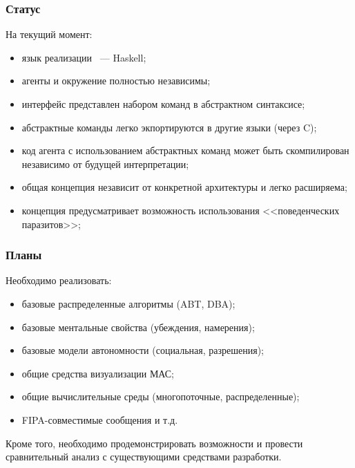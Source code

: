 \documentclass{beamer}
\begin{document}
\begin{frame}
  \frametitle{Статус}
  На текущий момент:
  \begin{itemize}
    \item язык реализации ~--- Haskell;
    \item агенты и окружение полностью независимы;
    \item интерфейс представлен набором команд в абстрактном синтаксисе;
    \item абстрактные команды легко экпортируются в другие языки (через C);
    \item код агента с использованием абстрактных команд может быть скомпилирован
      независимо от будущей интерпретации;
    \item общая концепция независит от конкретной архитектуры и легко расширяема;
    \item концепция предусматривает возможность использования <<поведенческих паразитов>>;
  \end{itemize}
\end{frame}

\begin{frame}
  \frametitle{Планы}
  Необходимо реализовать:
  \begin{itemize}
    \item базовые распределенные алгоритмы (ABT, DBA);
    \item базовые ментальные свойства (убеждения, намерения);
    \item базовые модели автономности (социальная, разрешения);
    \item общие средства визуализации МАС;
    \item общие вычислительные среды (многопоточные, распределенные);
    \item FIPA-совместимые сообщения и т.д.
  \end{itemize}

  Кроме того, необходимо продемонстрировать возможности и провести сравнительный анализ
  с существующими средствами разработки.
\end{frame}
\end{document}
